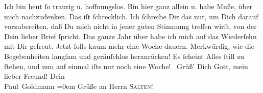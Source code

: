 \begin{ledgroupsized}[t]{13cm}
           \pstart
           Ich bin heut ſo traurig u. hoffnungslos. Bin hier ganz
               allein u. habe Muße, über mich nachzudenken. Das iſt ſchrecklich. Ich ſchreibe Dir
               das nur, um Dich darauf vorzubereiten, daß Du mich nicht in jener guten Stimmung
               treffen wirſt, von der Dein lieber Brief ſpricht.\pend
           \pstart
           {\pb}Das ganze Jahr über habe  ich mich auf das Wiederſehn mit Dir gefreut. Jetzt ſolls kaum mehr eine Woche
               dauern. Merkwürdig, wie die Begebenheiten langſam und geräuſchlos heranrücken! Es
               ſcheint Alles ſtill zu ſtehen, und nun auf einmal iſts nur noch eine Woche! {\dotsfive}\pend
           \pstart
           Grüß’ Dich Gott, mein lieber Freund!\pend
           \pstart
           Dein {\\[\baselineskip]}\spacefill\mbox{Paul Goldmann}\pend
           \leftskip=0em{}\pstart
           \noindent{}Grüße an Herrn \textsc{Salten}!\pend
           
         
         \endnumbering{}\end{ledgroupsized}  \newcommand{\dateiname}{L02745}\newcommand{\titel}{Paul Goldmann an Arthur Schnitzler, 19. 8. [1895]}\newcommand{\editorInnen}{Martin Anton Müller und Laura Untner}
      